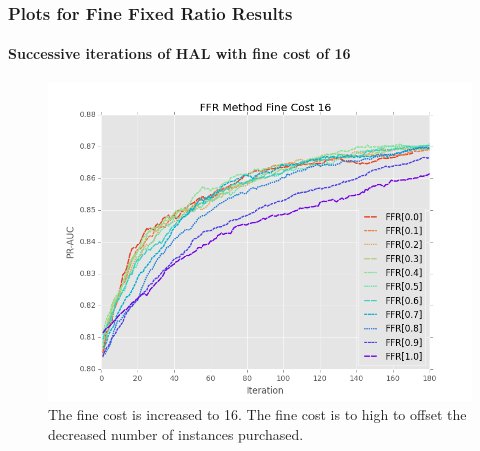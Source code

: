 \documentclass{beamer}
\begin{document}
\begin{frame}[noframenumbering]
    \frametitle{Plots for Fine Fixed Ratio Results}  %
    \framesubtitle{Successive iterations of HAL with fine cost of 16}
    \begin{figure}[!htb]
        \centering
        \includegraphics[width=0.8\columnwidth]{fig/ParamsFFR_PR_Cost16_rnds0_180}
        \caption{The fine cost is increased to 16. The fine cost is to high to offset the decreased number of instances purchased.}
        \label{fig:ParamsFFR_PR_Cost16_rnds0_180}
    \end{figure}
\end{frame}
\end{document}
